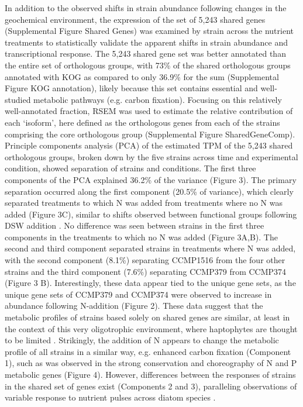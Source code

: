 In addition to the observed shifts in strain abundance following changes in the geochemical environment, the expression of the set of 5,243 shared genes (Supplemental Figure Shared Genes) was examined by strain across the nutrient treatments to statistically validate the apparent shifts in strain abundance and transcriptional response. The 5,243 shared gene set was better annotated than the entire set of orthologous groups, with 73\% of the shared orthologous groups annotated with KOG as compared to only 36.9\% for the sum (Supplemental Figure KOG annotation), likely because this set contains essential and well-studied metabolic pathways (e.g. carbon fixation). Focusing on this relatively well-annotated fraction, RSEM \citep{Li2011} was used to estimate the relative contribution of each `isoform', here defined as the orthologous genes from each of the strains comprising the core orthologous group (Supplemental Figure SharedGeneComp). Principle components analysis (PCA) of the estimated TPM of the 5,243 shared orthologous groups, broken down by the five strains across time and experimental condition, showed separation of strains and conditions. The first three components of the PCA explained 36.2\% of the variance (Figure 3). The primary separation occurred along the first component (20.5\% of variance), which clearly separated treatments to which N was added from treatments where no N was added (Figure 3C), similar to shifts observed between functional groups following DSW addition \citep{Alexander2015a}. No difference was seen between strains in the first three components in the treatments to which no N was added (Figure 3A,B). The second and third component separated strains in treatments where N was added, with the second component (8.1\%) separating CCMP1516 from the four other strains and the third component (7.6\%) separating CCMP379 from CCMP374 (Figure 3 B). Interestingly, these data appear tied to the unique gene sets, as the unique gene sets of CCMP379 and CCMP374 were observed to increase in abundance following N-addition (Figure 2). These data suggest that the metabolic profiles of strains based solely on shared genes are similar, at least in the context of this very oligotrophic environment, where haptophytes are thought to be limited \citep{Alexander2015a}. Strikingly, the addition of N appears to change the metabolic profile of all strains in a similar way, e.g. enhanced carbon fixation (Component 1), such as was observed in the strong conservation and choreography of N and P metabolic genes (Figure 4). However, differences between the responses of strains in the shared set of genes exist (Components 2 and 3), paralleling observations of variable response to nutrient pulses across diatom species \citep{Alexander2015}.  \par

